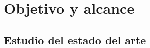 \section{Objetivo y alcance} \label{sec:2_objetivo_y_alcance}

\subsection{Estudio del estado del arte} \label{subsec:2_1_estudio_estado_arte}

